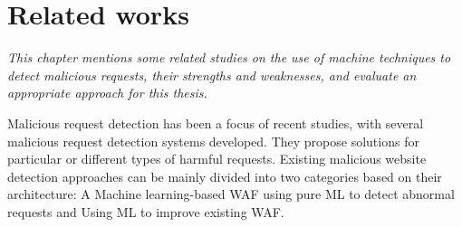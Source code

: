 \chapter{Related works}
\label{chap:literaturereview}
	\textit{This chapter mentions some related studies on the use of machine techniques to detect malicious requests, their strengths and weaknesses, and evaluate an appropriate approach for this thesis.}
\minitoc
\newpage	

Malicious request detection has been a focus of recent studies, with several malicious request detection systems developed. They propose solutions for particular or different types of harmful requests. Existing malicious website detection approaches can be mainly divided into two categories based on their architecture: A Machine learning-based WAF using pure ML to detect abnormal requests and Using ML to improve existing WAF.

